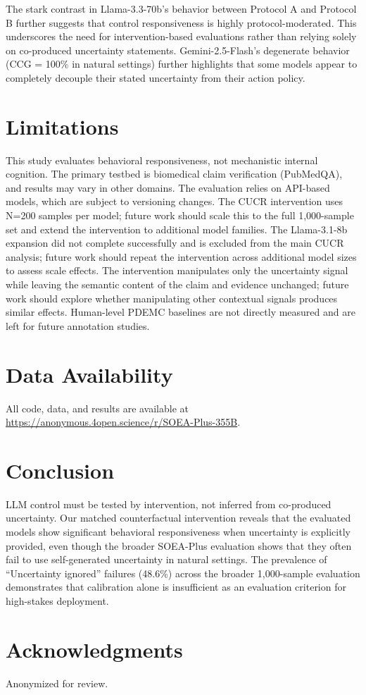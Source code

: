 \documentclass[11pt]{article}
\begin{document}
The stark contrast in Llama-3.3-70b's behavior between Protocol A and Protocol B further suggests that control responsiveness is highly protocol-moderated. This underscores the need for intervention-based evaluations rather than relying solely on co-produced uncertainty statements. Gemini-2.5-Flash's degenerate behavior (CCG = 100\% in natural settings) further highlights that some models appear to completely decouple their stated uncertainty from their action policy.

\section{Limitations}

This study evaluates behavioral responsiveness, not mechanistic internal cognition. The primary testbed is biomedical claim verification (PubMedQA), and results may vary in other domains. The evaluation relies on API-based models, which are subject to versioning changes. The CUCR intervention uses N=200 samples per model; future work should scale this to the full 1,000-sample set and extend the intervention to additional model families. The Llama-3.1-8b expansion did not complete successfully and is excluded from the main CUCR analysis; future work should repeat the intervention across additional model sizes to assess scale effects. The intervention manipulates only the uncertainty signal while leaving the semantic content of the claim and evidence unchanged; future work should explore whether manipulating other contextual signals produces similar effects. Human-level PDEMC baselines are not directly measured and are left for future annotation studies.

\section*{Data Availability}
All code, data, and results are available at \url{https://anonymous.4open.science/r/SOEA-Plus-355B}.

\section{Conclusion}

LLM control must be tested by intervention, not inferred from co-produced uncertainty. Our matched counterfactual intervention reveals that the evaluated models show significant behavioral responsiveness when uncertainty is explicitly provided, even though the broader SOEA-Plus evaluation shows that they often fail to use self-generated uncertainty in natural settings. The prevalence of ``Uncertainty ignored'' failures (48.6\%) across the broader 1,000-sample evaluation demonstrates that calibration alone is insufficient as an evaluation criterion for high-stakes deployment.

\section*{Acknowledgments}
Anonymized for review.


\end{document}

